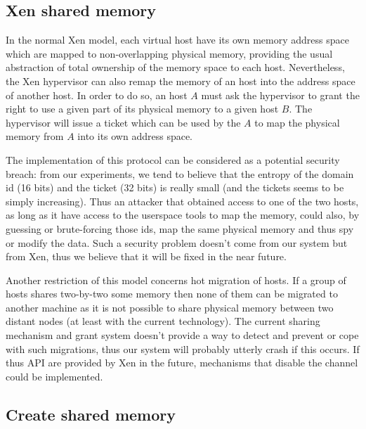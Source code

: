\documentclass[journal]{IEEEtran}
\begin{document}
\subsection{Xen shared memory}

In the normal Xen model, each virtual host have its own memory address space which are mapped to non-overlapping physical memory, providing the usual abstraction of total ownership of the memory space to each host. Nevertheless, the Xen hypervisor can also remap the memory of an host into the address space of another host. In order to do so, an host $A$ must ask the hypervisor to grant the right to use a given part of its physical memory to a given host $B$. The hypervisor will issue a ticket which can be used by the $A$ to map the physical memory from $A$ into its own address space.

The implementation of this protocol can be considered as a potential security breach: from our experiments, we tend to believe that the entropy of the domain id (16 bits) and the ticket (32 bits) is really small (and the tickets seems to be simply increasing). Thus an attacker that obtained access to one of the two hosts, as long as it have access to the userspace tools to map the memory, could also, by guessing or brute-forcing those ids, map the same physical memory and thus spy or modify the data. Such a security problem doesn't come from our system but from Xen, thus we believe that it will be fixed in the near future.

Another restriction of this model concerns hot migration of hosts. If a group of hosts shares two-by-two some memory then none of them can be migrated to another machine as it is not possible to share physical memory between two distant nodes (at least with the current technology). The current sharing mechanism and grant system doesn't provide a way to detect and prevent or cope with such migrations, thus our system will probably utterly crash if this occurs. If thus API are provided by Xen in the future, mechanisms that disable the channel could be implemented.

\subsection{Create shared memory}
\end{document}

